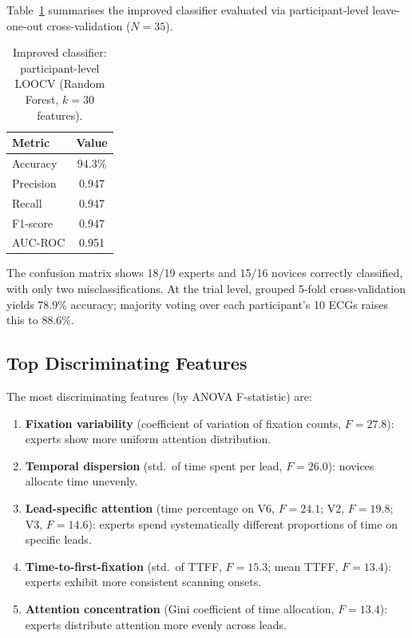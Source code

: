 \documentclass[sigconf]{acmart}
\theoremstyle{plain}
\theoremstyle{definition}
\begin{document}
Table~\ref{tab:results} summarises the improved classifier evaluated via participant-level leave-one-out cross-validation ($N=35$).

\begin{table}[h]
\centering
\caption{Improved classifier: participant-level LOOCV (Random Forest, $k=30$ features).}
\label{tab:results}
\begin{tabular}{@{}lc@{}}
\toprule
\textbf{Metric} & \textbf{Value} \\ \midrule
Accuracy  & 94.3\% \\
Precision & 0.947 \\
Recall    & 0.947 \\
F1-score  & 0.947 \\
AUC-ROC   & 0.951 \\ \bottomrule
\end{tabular}
\end{table}

The confusion matrix shows 18/19 experts and 15/16 novices correctly classified, with only two misclassifications.
At the trial level, grouped 5-fold cross-validation yields 78.9\% accuracy; majority voting over each participant's 10 ECGs raises this to 88.6\%.

\subsection{Top Discriminating Features}

The most discriminating features (by ANOVA F-statistic) are:
\begin{enumerate}
    \item \textbf{Fixation variability} (coefficient of variation of fixation counts, $F=27.8$): experts show more uniform attention distribution.
    \item \textbf{Temporal dispersion} (std.\ of time spent per lead, $F=26.0$): novices allocate time unevenly.
    \item \textbf{Lead-specific attention} (time percentage on V6, $F=24.1$; V2, $F=19.8$; V3, $F=14.6$): experts spend systematically different proportions of time on specific leads.
    \item \textbf{Time-to-first-fixation} (std.\ of TTFF, $F=15.3$; mean TTFF, $F=13.4$): experts exhibit more consistent scanning onsets.
    \item \textbf{Attention concentration} (Gini coefficient of time allocation, $F=13.4$): experts distribute attention more evenly across leads.
\end{enumerate}
\end{document}
